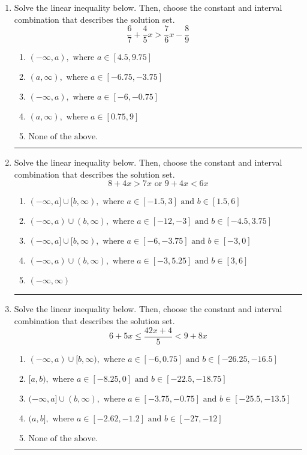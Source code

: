 \documentclass[14pt]{extbook}
\newcommand{\litem}[1]{\item#1\hspace*{-1cm}\rule{\textwidth}{0.4pt}}
\begin{document}
\begin{enumerate}
{\begin{enumerate}[label=\Alph*.]
\end{enumerate} }
\litem{
Solve the linear inequality below. Then, choose the constant and interval combination that describes the solution set.\[ \frac{6}{7} + \frac{4}{5} x > \frac{7}{6} x - \frac{8}{9} \]\begin{enumerate}[label=\Alph*.]
\item \( (-\infty, a), \text{ where } a \in [4.5, 9.75] \)
\item \( (a, \infty), \text{ where } a \in [-6.75, -3.75] \)
\item \( (-\infty, a), \text{ where } a \in [-6, -0.75] \)
\item \( (a, \infty), \text{ where } a \in [0.75, 9] \)
\item \( \text{None of the above}. \)

\end{enumerate} }
\litem{
Solve the linear inequality below. Then, choose the constant and interval combination that describes the solution set.\[ 8 + 4 x > 7 x \text{ or } 9 + 4 x < 6 x \]\begin{enumerate}[label=\Alph*.]
\item \( (-\infty, a] \cup [b, \infty), \text{ where } a \in [-1.5, 3] \text{ and } b \in [1.5, 6] \)
\item \( (-\infty, a) \cup (b, \infty), \text{ where } a \in [-12, -3] \text{ and } b \in [-4.5, 3.75] \)
\item \( (-\infty, a] \cup [b, \infty), \text{ where } a \in [-6, -3.75] \text{ and } b \in [-3, 0] \)
\item \( (-\infty, a) \cup (b, \infty), \text{ where } a \in [-3, 5.25] \text{ and } b \in [3, 6] \)
\item \( (-\infty, \infty) \)

\end{enumerate} }
\litem{
Solve the linear inequality below. Then, choose the constant and interval combination that describes the solution set.\[ 6 + 5 x \leq \frac{42 x + 4}{5} < 9 + 8 x \]\begin{enumerate}[label=\Alph*.]
\item \( (-\infty, a) \cup [b, \infty), \text{ where } a \in [-6, 0.75] \text{ and } b \in [-26.25, -16.5] \)
\item \( [a, b), \text{ where } a \in [-8.25, 0] \text{ and } b \in [-22.5, -18.75] \)
\item \( (-\infty, a] \cup (b, \infty), \text{ where } a \in [-3.75, -0.75] \text{ and } b \in [-25.5, -13.5] \)
\item \( (a, b], \text{ where } a \in [-2.62, -1.2] \text{ and } b \in [-27, -12] \)
\item \( \text{None of the above.} \)


\end{enumerate}}
\end{enumerate}
\end{document}
